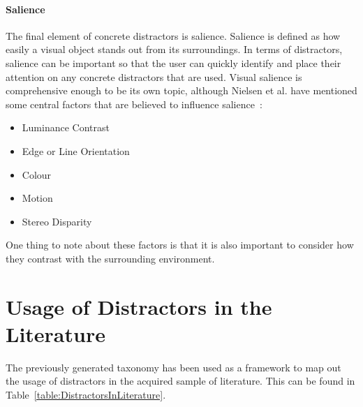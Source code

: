 \paragraph{Salience}
The final element of concrete distractors is salience. Salience is defined as how easily a visual object stands out from its surroundings. In terms of distractors, salience can be important so that the user can quickly identify and place their attention on any concrete distractors that are used. Visual salience is comprehensive enough to be its own topic, although Nielsen et al. have mentioned some central factors that are believed to influence salience~\cite{nielsen2016missing}:
\begin{itemize}
    \item Luminance Contrast
    \item Edge or Line Orientation
    \item Colour
    \item Motion
    \item Stereo Disparity
\end{itemize}
One thing to note about these factors is that it is also important to consider how they contrast with the surrounding environment. 


\section{Usage of Distractors in the Literature}
The previously generated taxonomy has been used as a framework to map out the usage of distractors in the acquired sample of literature. This can be found in Table~\ref{table:DistractorsInLiterature}.

